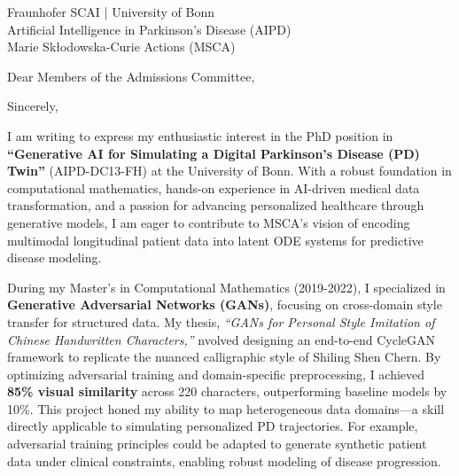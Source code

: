 \documentclass[11pt,a4paper, final]{moderncv}
\begin{document}
{Fraunhofer SCAI | University of Bonn\\
Artificial Intelligence in Parkinson's Disease (AIPD)\\
Marie Skłodowska-Curie Actions (MSCA)
}
\date{\today}
\opening{Dear Members of the Admissions Committee,}
\closing{Sincerely,}
\makelettertitle
\thispagestyle{empty}
\pagestyle{empty}
I am writing to express my enthusiastic interest in the PhD position 
in \textbf{``Generative AI for Simulating a Digital Parkinson's Disease (PD) Twin''} (AIPD-DC13-FH) 
at the University of Bonn. 
With a robust foundation in computational mathematics, 
hands-on experience in AI-driven medical data transformation, 
and a passion for advancing personalized healthcare through generative models, 
I am eager to contribute to MSCA's vision of encoding multimodal longitudinal patient data into latent ODE systems for predictive disease modeling.

During my Master's in Computational Mathematics (2019-2022), 
I specialized in \textbf{Generative Adversarial Networks (GANs)}, 
focusing on cross-domain style transfer for structured data. 
My thesis, \emph{``GANs for Personal Style Imitation of Chinese Handwritten Characters,''} 
nvolved designing an end-to-end CycleGAN framework to replicate the nuanced calligraphic style of Shiling Shen Chern. 
By optimizing adversarial training and domain-specific preprocessing, 
I achieved \textbf{85\% visual similarity} across 220 characters, outperforming baseline models by 10\%. 
This project honed my ability to map heterogeneous data domains—a skill directly applicable to simulating personalized PD trajectories. 
For example, adversarial training principles could be adapted to generate synthetic patient data under clinical constraints, enabling robust modeling of disease progression.
\end{document}
